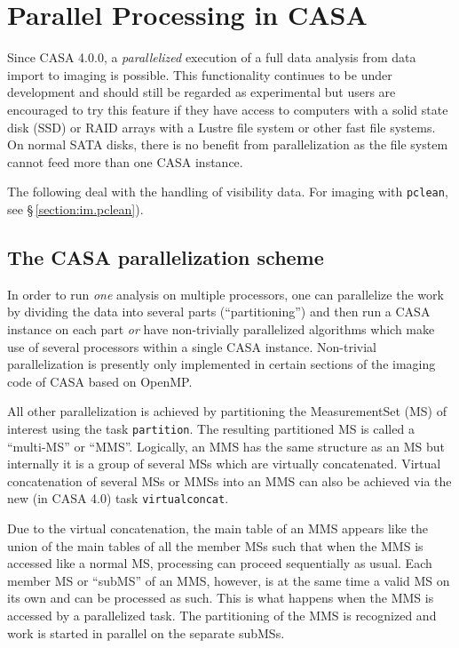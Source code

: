 
\chapter{Parallel Processing in CASA}
\label{chapter:parallel}

Since CASA 4.0.0, a {\it parallelized} execution of a full data analysis from data import
to imaging is possible.
This functionality continues to be under development and should still be regarded as experimental
but users are encouraged to try this feature if they have access to computers with
a solid state disk (SSD) or RAID arrays with a Lustre file system or other fast
file systems. On normal SATA disks, there is no benefit from parallelization as
the file system cannot feed more than one CASA instance.

The following deal with the handling of visibility data. For imaging
with {\tt pclean}, see \S\,\ref{section:im.pclean}).

\section{The CASA parallelization scheme}

In order to run {\it one} analysis on multiple processors, one can parallelize the
work by dividing the data into several parts (``partitioning'') and then
run a CASA instance on each part {\it or} have non-trivially parallelized
algorithms which make use of several processors within a single CASA instance.
Non-trivial parallelization is presently only implemented in certain sections of 
the imaging code of CASA based on OpenMP.

All other parallelization is achieved by partitioning the MeasurementSet (MS) of
interest using the task {\tt partition}. The resulting partitioned MS is called
a ``multi-MS'' or ``MMS''. Logically, an MMS has the same structure as an MS but
internally it is a group of several MSs which are virtually concatenated.
Virtual concatenation of several MSs or MMSs into an MMS can also be 
achieved via the new (in CASA 4.0) task {\tt virtualconcat}.

Due to the virtual concatenation, the main table of an MMS appears like
the union of the main tables of all the member MSs such that when the MMS
is accessed like a normal MS, processing can proceed sequentially as usual.
Each member MS or ``subMS'' of an MMS, however, is at the same time a valid MS on its own 
and can be processed as such. This is what happens when the MMS is accessed
by a parallelized task. The partitioning of the MMS is recognized and work
is started in parallel on the separate subMSs. 

